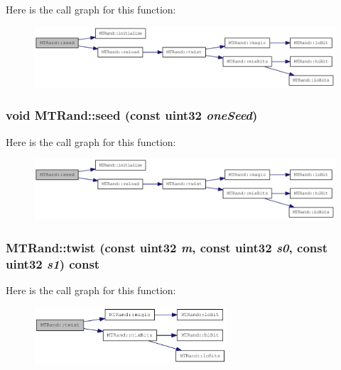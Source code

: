 Here is the call graph for this function:\nopagebreak
\begin{figure}[H]
\begin{center}
\leavevmode
\includegraphics[width=337pt]{classMTRand_a5758103776b131e8ea46b6dc1b9fb267_cgraph}
\end{center}
\end{figure}
\hypertarget{classMTRand_a1e21a79e0a30225fffe924229e34a923}{
\subsubsection[{seed}]{\setlength{\rightskip}{0pt plus 5cm}void MTRand::seed (const {\bf uint32} {\em oneSeed})}}
\label{classMTRand_a1e21a79e0a30225fffe924229e34a923}


Here is the call graph for this function:\nopagebreak
\begin{figure}[H]
\begin{center}
\leavevmode
\includegraphics[width=337pt]{classMTRand_a1e21a79e0a30225fffe924229e34a923_cgraph}
\end{center}
\end{figure}
\hypertarget{classMTRand_acf32530212717166e3d02dd3cc0b68c4}{
\subsubsection[{twist}]{ MTRand::twist (const {\bf uint32} {\em m}, \/  const {\bf uint32} {\em s0}, \/  const {\bf uint32} {\em s1}) const}}
\label{classMTRand_acf32530212717166e3d02dd3cc0b68c4}


Here is the call graph for this function:\nopagebreak
\begin{figure}[H]
\begin{center}
\leavevmode
\includegraphics[width=203pt]{classMTRand_acf32530212717166e3d02dd3cc0b68c4_cgraph}
\end{center}
\end{figure}


